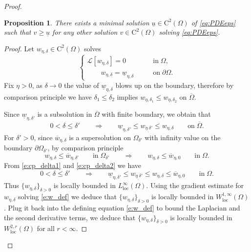 \documentclass[11pt,reqno]{amsart}
\numberwithin{figure}{section}
\theoremstyle{plain}
\newtheorem{prop}[thm]{Proposition}
\theoremstyle{remark}
\numberwithin{equation}{section}
\begin{document}
\begin{proof}
\begin{prop}\label{pro:minimalsol} There exists a minimal solution $\underline{u}\in \mathrm{C}^2(\Omega)$ of \eqref{eq:PDEeps} such that $v\geq \underline{u}$ for any other solution $v\in \mathrm{C}^2(\Omega)$ solving \eqref{eq:PDEeps}.
\end{prop}
\begin{proof} Let $w_{\eta,\delta}\in \mathrm{C}^2(\Omega)$ solves
    \begin{equation}\label{e:w_def}
    \begin{cases}
        \mathcal{L}\left[w_{\eta,\delta}\right] = 0 &\qquad\text{in}\;\Omega,\\
        \qquad w_{\eta,\delta} = \underline{w}_{\eta,\delta} &\qquad\text{on}\;\partial\Omega.
    \end{cases}
    \end{equation}
    Fix $\eta>0$, as $\delta\to 0$ the value of $\underline{w}_{\eta,\delta}$ blows up on the boundary, therefore by comparison principle we have $\delta_1 \leq  \delta_2$ implies $w_{\eta,\delta_1}\leq  w_{\eta,\delta_2}$ on $\overline{\Omega}$. 

    
    \noindent Since $\underline{w}_{\eta,\delta'}$ is a subsolution in $\overline{\Omega}$ with finite boundary, we obtain that
    \begin{equation}\label{e:cp_delta1}
        0<\delta \leq \delta'\qquad\Longrightarrow\qquad \underline{w}_{\eta,\delta'} \leq w_{\eta_,\delta'}\leq w_{\eta,\delta} \qquad\text{on}\;\overline{\Omega}.
    \end{equation}
    For $\delta' > 0$, since $\overline{w}_{\eta,\delta}$ is a supersolution on $\Omega_{\delta'}$ with infinity value on the boundary $\partial\Omega_{\delta'}$, by comparison principle
    \begin{equation}\label{e:cp_delta2}
        w_{\eta,\delta} \leq \overline{w}_{\eta, \delta'} \qquad\text{in}\;\Omega_{\delta'} \qquad\Longrightarrow\qquad w_{\eta,\delta} \leq \overline{w}_{\eta,0} \qquad\text{in}\;\Omega.
    \end{equation}
    From \eqref{e:cp_delta1} and \eqref{e:cp_delta2} we have
    \begin{equation}\label{e:cp_delta3}
        0<\delta \leq \delta'\qquad\Longrightarrow\qquad \underline{w}_{\eta,\delta'} \leq w_{\eta_,\delta'}\leq w_{\eta,\delta} \leq \overline{w}_{\eta,0} \qquad\text{in}\;\Omega.
    \end{equation}
    Thus $\{w_{\eta,\delta}\}_{\delta>0}$ is locally bounded in $L^{\infty}_{\mathrm{loc}}(\Omega)$. Using the gradient estimate for $w_{\eta,\delta}$ solving \eqref{e:w_def} we deduce that $\{w_{\eta,\delta}\}_{\delta>0}$ is locally bounded in $W^{1,\infty}_{\mathrm{loc}}(\Omega)$. Plug it back into the defining equation \eqref{e:w_def} to bound the Laplacian and the second derivative terms, we deduce that $\{w_{\eta,\delta}\}_{\delta>0}$ is locally bounded in $W^{2,r}_{\mathrm{loc}}(\Omega)$ for all $r<\infty$.
    

\end{proof}
\end{proof}
\end{document}
